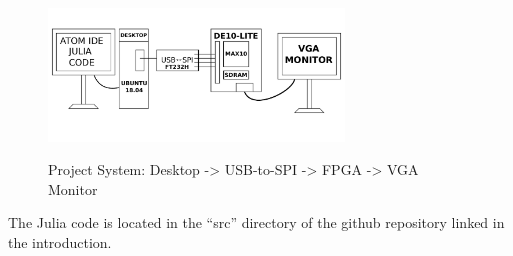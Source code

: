 \begin{figure}[ht]
	\centering
	\includegraphics[width=0.7\textwidth]{images/project_system}
	\centering\bfseries
	\caption{Project System:  Desktop -> USB-to-SPI -> FPGA -> VGA Monitor}
\end{figure}

The Julia code is located in the ``src'' directory of the github repository linked in the introduction.
